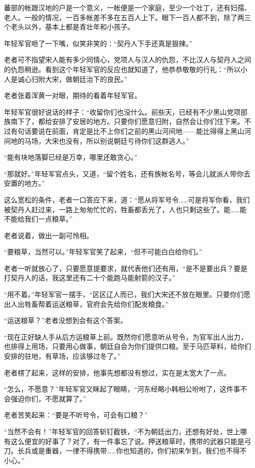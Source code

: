 蕃部的帐跟汉地的户是一个意义，一帐便是一个家庭，至少一个壮丁，还有妇孺、老人。一般的情况，一百多帐差不多在五百人上下。眼下一百人都不到，除了两三个老头以外，基本上都是青壮年和小孩子。

年轻军官咂了一下嘴，似笑非笑的：“契丹人下手还真是狠辣。”

老者可不指望宋人能有多少同情心，党项人与汉人的仇怨，不比汉人与契丹人之间的仇怨稍逊。看到这个年轻军官的反应也就知道了，他恭恭敬敬的行礼：“所以小人是诚心归附大宋，做朝廷治下的良民。”

老者张着浑黄一对眼，期待的看着年轻军官。

年轻军官很好说话的样子：“收留你们也没什么。前些天，已经有不少黑山党项部族南下了，都给安排了安居的地方。只要你们愿意归附，自然会让你们住下来。不过有句话要说在前面，肯定是比不上你们之前的黑山河间地——能比得得上黑山河间地的马场，大宋也没有，所以别说朝廷亏待你们这群逃人。”

“能有块地落脚已经是万幸，哪里还敢贪心。”

“那就好。”年轻军官点头，又道，“留个姓名，还有族帐名号，等会儿就派人带你去安置的地方。”

这么宽松的条件，老者一口答应下来，道：“愿从将军号令……可是将军你看，我们被契丹人赶过来，一路上匆匆忙忙的，牲畜都丢光了，人也只剩这些了。能……能不能给我们一点粮草。”

老者说着，做出一副可怜相。

“要粮草，当然可以。”年轻军官笑了起来，“但不可能白白给你们。”

老者一听就放心了，只要愿意提要求，就代表他们还有用，“是不是要出兵？要是打契丹人的话，我这里还有二十个能跑马能射箭的汉子。”

“用不着。”年轻军官一摆手，“区区辽人而已，我们大宋还不放在眼里。只要你们愿出人出牲畜帮着运送粮草，官府会先给你们配发粮食。”

“运送粮草？”老者没想到会有这个答案。

“现在正好缺人手从后方运粮草上前。既然你们愿意听从号令，为官军出人出力，也排得上用场，只要用心做事，朝廷自会为你们提供口粮。至于马匹草料，给你们安排的驻地，有草场，应该够过冬了。”

老者楞了起来，这样的安排，他事先想都没有想过，实在是太宽大了一点。

“怎么，不愿意？”年轻军官又眯起了眼睛，“河东经略小韩相公吩咐了，这件事不会强迫你们，不愿就算了。”

老者苦笑起来：“要是不听号令，可会有口粮？”

“当然不会有！”年轻军官的回答斩钉截铁，“不为朝廷出力，还想有好处，世上哪有这么便宜的好事了？对了，有一件事忘了说。押送粮草时，携带的武器只能是弓刀。长兵或是重器，一律不得携带……你也知道的，你们初来乍到，我们也不得不小心。”

